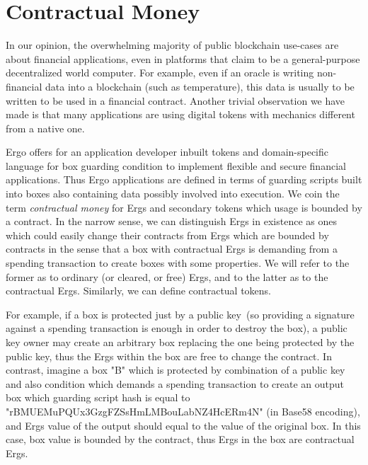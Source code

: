 

\section{Contractual Money}
    \label{sec:contractual}


 In our opinion, the overwhelming majority of public blockchain use-cases are about financial applications,
 even in platforms that claim to be a general-purpose decentralized world computer.
 For example, even if an oracle is writing
 non-financial data into a blockchain (such as temperature), this data is usually to be written to be used in a financial
 contract. Another trivial observation we have made is that many applications are using digital tokens with mechanics
 different from a native one.

 Ergo offers for an application developer inbuilt tokens and domain-specific language for box guarding
 condition to implement flexible and secure financial applications.
 Thus Ergo applications are defined in terms of guarding scripts built into boxes also containing
 data possibly involved into execution. We coin the term {\em contractual money} for Ergs and secondary tokens which
 usage is bounded by a contract. In the narrow sense, we can distinguish Ergs in existence as ones which could easily
 change their contracts from Ergs which are bounded by contracts in the sense that a box with contractual Ergs is
 demanding from a spending transaction to create boxes with some properties. We will refer to the former as to ordinary
 (or cleared, or free) Ergs, and to the latter as to the contractual Ergs. Similarly, we can define contractual tokens.

 For example, if a box is protected just by a public key~(so providing a signature against a spending transaction is
 enough in order to destroy the box), a public key owner may create an arbitrary box replacing the one being protected
 by the public key, thus the Ergs within the box are free to change the contract. In contrast, imagine a box "B" which
 is protected by combination of a public key and also condition which demands a spending transaction to create an output
 box which guarding script hash is equal to "rBMUEMuPQUx3GzgFZSsHmLMBouLabNZ4HcERm4N" (in Base58 encoding), and Ergs
 value of the output should equal to the value of the original box. In this case, box value is bounded by the contract,
 thus Ergs in the box are contractual Ergs.

